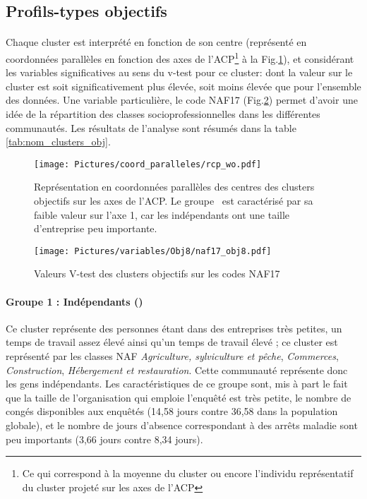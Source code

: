 \documentclass[11pt,fleqn,openany,frenchb]{book} %
\begin{document}
\subsection{Profils-types objectifs}
\paragraph{}
Chaque cluster est interprété en fonction de son centre (représenté en coordonnées parallèles en fonction des  axes de l'ACP\footnote{Ce qui correspond à la moyenne du cluster ou encore l'individu représentatif du cluster projeté sur les axes de l'ACP} à la  Fig.\ref{fig:CPobj}), et considérant les variables significatives au sens du v-test pour ce cluster: dont la valeur sur le cluster est soit significativement plus élevée, soit moins élevée que pour l'ensemble des données. Une variable particulière, le code NAF17 (Fig.\ref{fig:nafobj}) permet d'avoir une idée de la répartition des classes socioprofessionnelles dans les différentes communautés. Les résultats de l'analyse sont résumés dans la table \ref{tab:nom_clusters_obj}.


\begin{figure}[!h]
\centering
  \texttt{[image: Pictures/coord\_paralleles/rcp\_wo.pdf]}
\caption{Représentation en coordonnées parallèles des centres des clusters objectifs sur les axes de l'ACP. Le groupe \INDEP\ est caractérisé par sa faible valeur sur l'axe 1, car les indépendants ont une taille d'entreprise peu importante.}
\label{fig:CPobj}
\end{figure}

\begin{figure}[!h]
\centering
  \texttt{[image: Pictures/variables/Obj8/naf17\_obj8.pdf]}
\caption{Valeurs V-test des clusters objectifs sur les codes NAF17}
\label{fig:nafobj}
\end{figure}

\paragraph{Groupe 1 : Indépendants (\INDEP)\\}
Ce cluster représente des personnes étant dans des entreprises très petites, un temps de travail assez élevé ainsi qu'un temps de travail élevé ; ce cluster est représenté par les classes NAF \textit{Agriculture, sylviculture et pêche}, \textit{Commerces}, \textit{Construction}, \textit{Hébergement et restauration}. Cette communauté représente donc les gens indépendants. Les caractéristiques de ce groupe sont, mis à part le fait que la taille de l'organisation qui emploie l'enquêté est très petite, le nombre de congés disponibles aux enquêtés (14,58 jours contre 36,58 dans la population globale), et le nombre de jours d'absence correspondant à des arrêts maladie sont peu importants (3,66 jours contre 8,34 jours).
\end{document}
